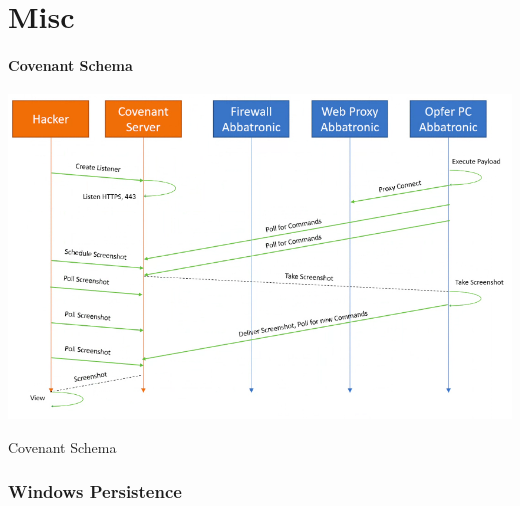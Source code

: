 \chapter{Misc}
\newpage
\subsubsection*{Covenant Schema}
\begin{table}[h]
  \centering
  \includegraphics[width=\textwidth]{resources/zzz_covenant_example.png}
  \caption{Covenant Schema}
\end{table}

\subsection{Windows Persistence}

